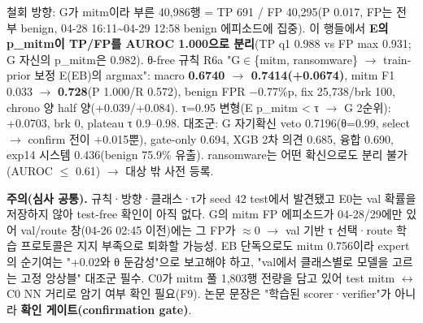 \par\noindent \textbullet\enspace 철회 방향: G가 mitm이라 부른 40,986행 =\allowbreak{} TP 691 /\allowbreak{} FP 40,295(P 0.017, FP는 전부 benign, 04-28 16:11\textasciitilde{}04-29 12:58 benign 에피소드에 집중). 이 행들에서 \textbf{E의 p\_\allowbreak{}mitm이 TP/\allowbreak{}FP를 AUROC 1.000으로 분리}(TP q1 0.988 vs FP max 0.931; G 자신의 p\_\allowbreak{}mitm은 0.982). θ-free 규칙 R6a "G\ensuremath{\in}\{mitm, ransomware\}  \ensuremath{\rightarrow}  train-prior 보정 E(EB)의 argmax": macro \textbf{0.6740 \ensuremath{\rightarrow} 0.7414(+\allowbreak{}0.0674)}, mitm F1 0.033 \ensuremath{\rightarrow} \textbf{0.728}(P 1.000/\allowbreak{}R 0.572), benign FPR −0.77\%p, fix 25,738/\allowbreak{}brk 100, chrono 양 half 양(+\allowbreak{}0.039/\allowbreak{}+\allowbreak{}0.084). τ=\allowbreak{}0.95 변형(E p\_\allowbreak{}mitm < τ  \ensuremath{\rightarrow}  G 2순위): +\allowbreak{}0.0703, brk 0, plateau τ 0.9–0.98. 대조군: G 자기확신 veto 0.7196(θ=\allowbreak{}0.99, select \ensuremath{\rightarrow} confirm 전이 +\allowbreak{}0.015뿐), gate-only 0.694, XGB 2차 의견 0.685, 융합 0.690, exp14 시스템 0.436(benign 75.9\% 유출). ransomware는 어떤 확신으로도 분리 불가(AUROC \ensuremath{\leq} 0.61)  \ensuremath{\rightarrow}  대상 밖 사전 등록.


\par\noindent \textbullet\enspace \textbf{주의(심사 공통).} 규칙·방향·클래스·τ가 seed 42 test에서 발견됐고 E0는 val 확률을 저장하지 않아 test-free 확인이 아직 없다. G의 mitm FP 에피소드가 04-28/\allowbreak{}29에만 있어 val/\allowbreak{}route 창(04-26 02:45 이전)에는 그 FP가 \ensuremath{\approx}0  \ensuremath{\rightarrow}  val 기반 τ 선택·route 학습 프로토콜은 지지 부족으로 퇴화할 가능성. EB 단독으로도 mitm 0.756이라 expert의 순기여는 "+\allowbreak{}0.02와 θ 둔감성"으로 보고해야 하고, "val에서 클래스별로 모델을 고르는 고정 앙상블" 대조군 필수. C0가 mitm 풀 1,803행 전량을 담고 있어 test mitm \ensuremath{\leftrightarrow} C0 NN 거리로 암기 여부 확인 필요(F9). 논문 문장은 "학습된 scorer·verifier"가 아니라 \textbf{확인 게이트(confirmation gate)}.


